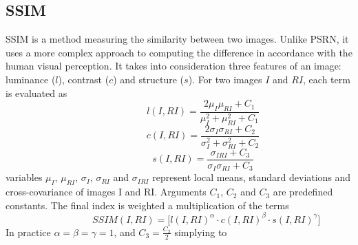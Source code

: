 \subsection{SSIM}
SSIM is a method measuring the similarity between two images. Unlike PSRN, it uses a more complex approach to computing the difference in accordance with the human visual perception. It takes into consideration three features of an image: luminance ($l$), contrast ($c$) and structure ($s$). For two images $I$ and $RI$, each term is evaluated as
\begin{equation} \label{eq:Lumi}
\hspace{3em} \hspace{3em} \hspace{3em} l(I,RI)= \frac{2\mu_{I} \mu_{RI} + C_1}{\mu_{I}^2 + \mu_{RI}^2 + C_1} \enspace \enspace \hspace{3em}
\end{equation}
\begin{equation} \label{eq:contra}
\hspace{3em} \hspace{3em} \hspace{3em} c(I,RI)= \frac{2\sigma_{I} \sigma_{RI} + C_2}{\sigma_{I}^2 + \sigma_{RI}^2 + C_2} \enspace \enspace \hspace{3em}
\end{equation}
\begin{equation} \label{eq:Struct}
\hspace{3em} \hspace{3em} \hspace{3em} s(I,RI)= \frac{\sigma_{IRI} + C_3}{\sigma_{I} \sigma_{RI} + C_3} \enspace \enspace \hspace{3em}
\end{equation}
variables $\mu_{I}$, $\mu_{RI}$, $\sigma_{I}$, $\sigma_{RI}$ and $\sigma_{IRI}$ represent local means, standard deviations and cross-covariance of images I and RI. Arguments $C_1$, $C_2$ and $C_3$ are predefined constants. The final index is weighted a multiplication of the terms
\begin{equation} \label{eq:ssim1}
\hspace{3em} \hspace{3em} \hspace{3em} SSIM(I,RI)= \big[ l(I,RI)^{\alpha} \cdot c(I,RI)^{\beta} \cdot s(I,RI)^{\gamma} \big]   \enspace \enspace \hspace{3em}
\end{equation}
In practice $\alpha = \beta = \gamma = 1$, and $C_3 = \frac{C_2}{2}$ simplying to
